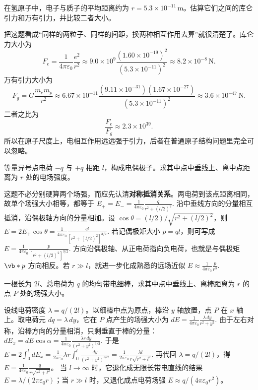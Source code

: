 \documentclass[lang=cn,11pt]{elegantbook}
\begin{document}
\begin{exercise}[氢原子中库仑力与万有引力的量级比较]
在氢原子中，电子与质子的平均距离约为 \(r=5.3\times 10^{-11}\,\mathrm{m}\)。估算它们之间的库仑引力和万有引力，并比较二者大小。
\end{exercise}

\begin{solution}
把这题看成“同样的两粒子、同样的间距，换两种相互作用去算”就很清楚了。库仑力大小为
\[
F_e=\frac{1}{4\pi\varepsilon_0}\frac{e^2}{r^2}
\approx 9.0\times 10^9
\frac{(1.60\times 10^{-19})^2}{(5.3\times 10^{-11})^2}
\approx 8.2\times 10^{-8}\,\mathrm{N}.
\]
万有引力大小为
\[
F_g=G\frac{m_em_p}{r^2}
\approx 6.67\times 10^{-11}
\frac{(9.11\times 10^{-31})(1.67\times 10^{-27})}{(5.3\times 10^{-11})^2}
\approx 3.6\times 10^{-47}\,\mathrm{N}.
\]
二者之比为
\[
\frac{F_e}{F_g}\approx 2.3\times 10^{39}.
\]
所以在原子尺度上，电相互作用远远强于引力，后者在普通原子结构问题里完全可以忽略。
\end{solution}

\begin{exercise}[电偶极子中垂线上的场强]
等量异号点电荷 \(-q\) 与 \(+q\) 相距 \(l\)，构成电偶极子。求其中点中垂线上、离中点距离为 \(r\) 处的电场强度。
\end{exercise}

\begin{solution}
这题不必分别硬算两个场强，而应先认清\textbf{对称抵消关系}。两电荷到该点距离相同，故单个场强大小相等，都等于
 \(E_+=E_-=\frac{1}{4\pi\varepsilon_0}\frac{q}{r^2+(l/2)^2}.\) 
沿中垂线方向的分量相互抵消，沿偶极轴方向的分量相加。设 \(\cos\theta=(l/2)/\sqrt{r^2+(l/2)^2}\)，则
 \(E=2E_+\cos\theta =\frac{1}{4\pi\varepsilon_0} \frac{ql}{\left[r^2+(l/2)^2\right]^{3/2}}.\) 
若记偶极矩大小 \(p=ql\)，则可写成
 \(E=\frac{1}{4\pi\varepsilon_0} \frac{p}{\left[r^2+(l/2)^2\right]^{3/2}}.\) 
方向沿偶极轴、从正电荷指向负电荷，也就是与偶极矩 \(\vb*{p}\) 方向相反。若 \(r\gg l\)，就进一步化成熟悉的远场近似
 \(E\approx \frac{1}{4\pi\varepsilon_0}\frac{p}{r^3}.\) 
\end{solution}

\begin{exercise}[均匀带电细棒中垂线上的场强]
一根长为 \(2l\)、总电荷为 \(q\) 的均匀带电细棒，求其中点中垂线上、离棒距离为 \(r\) 的点 \(P\) 处的场强大小。
\end{exercise}

\begin{solution}
设线电荷密度 \(\lambda=q/(2l)\)。以细棒中点为原点，棒沿 \(y\) 轴放置，点 \(P\) 在 \(x\) 轴上。取电荷元 \(dq=\lambda\,dy\)，它在 \(P\) 点产生的场强大小为
 \(dE=\frac{1}{4\pi\varepsilon_0}\frac{\lambda\,dy}{r^2+y^2}.\) 
由于左右对称，沿棒方向的分量相消，只剩垂直于棒的分量：
 \(dE_x=dE\cos\alpha =\frac{1}{4\pi\varepsilon_0}\frac{\lambda r\,dy}{(r^2+y^2)^{3/2}}.\) 
于是
 \(E =2\int_0^l dE_x =\frac{1}{2\pi\varepsilon_0}\lambda r\int_0^l\frac{dy}{(r^2+y^2)^{3/2}} =\frac{1}{2\pi\varepsilon_0}\frac{\lambda l}{r\sqrt{r^2+l^2}}.\) 
再代回 \(\lambda=q/(2l)\)，得 \(E=\frac{1}{4\pi\varepsilon_0}\frac{q}{r\sqrt{r^2+l^2}}\)。
当 \(l\to\infty\) 时，它退化成无限长带电直线的结果 \(E=\lambda/(2\pi\varepsilon_0 r)\)；当 \(r\gg l\) 时，又退化成点电荷场强 \(E\approx q/(4\pi\varepsilon_0 r^2)\)。
\end{solution}
\end{document}
